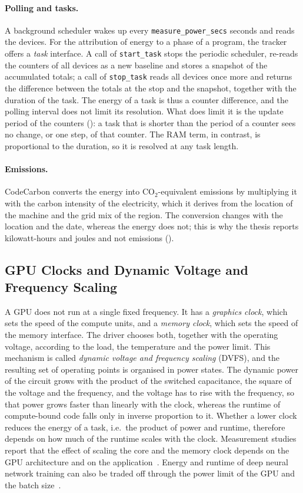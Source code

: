 \paragraph{Polling and tasks.} A background scheduler wakes up every \texttt{measure\_power\_secs} seconds and reads the devices.
For the attribution of energy to a phase of a program, the tracker offers a \emph{task} interface.
A call of \texttt{start\_task} stops the periodic scheduler, re-reads the counters of all devices as a new baseline and stores a snapshot of the accumulated totals; a call of \texttt{stop\_task} reads all devices once more and returns the difference between the totals at the stop and the snapshot, together with the duration of the task.
The energy of a task is thus a counter difference, and the polling interval does not limit its resolution.
What does limit it is the update period of the counters (): a task that is shorter than the period of a counter sees no change, or one step, of that counter.
The RAM term, in contrast, is proportional to the duration, so it is resolved at any task length.

\paragraph{Emissions.} CodeCarbon converts the energy into CO$_2$-equivalent emissions by multiplying it with the carbon intensity of the electricity, which it derives from the location of the machine and the grid mix of the region.
The conversion changes with the location and the date, whereas the energy does not; this is why the thesis reports kilowatt-hours and joules and not emissions ().

\subsection{GPU Clocks and Dynamic Voltage and Frequency Scaling}\label{sec:gpu-dvfs}

A GPU does not run at a single fixed frequency.
It has a \emph{graphics clock}, which sets the speed of the compute units, and a \emph{memory clock}, which sets the speed of the memory interface.
The driver chooses both, together with the operating voltage, according to the load, the temperature and the power limit.
This mechanism is called \emph{dynamic voltage and frequency scaling} (DVFS), and the resulting set of operating points is organised in power states.
The dynamic power of the circuit grows with the product of the switched capacitance, the square of the voltage and the frequency, and the voltage has to rise with the frequency, so that power grows faster than linearly with the clock, whereas the runtime of compute-bound code falls only in inverse proportion to it.
Whether a lower clock reduces the energy of a task, i.e.\ the product of power and runtime, therefore depends on how much of the runtime scales with the clock.
Measurement studies report that the effect of scaling the core and the memory clock depends on the GPU architecture and on the application~\cite{mei2017dvfs,abe2014gpu}.
Energy and runtime of deep neural network training can also be traded off through the power limit of the GPU and the batch size~\cite{you2023zeus}.

